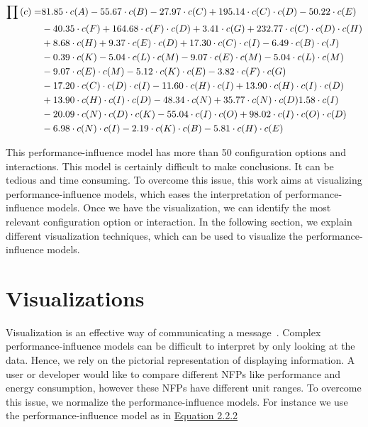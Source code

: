 \begin{align}
\prod {(c)}  = &81.85 \cdot c(A) - 55.67 \cdot c(B) - 27.97 \cdot
    c(C)+195.14\cdot c(C)\cdot c(D) - 50.22 \cdot c(E) \notag\\
    &- 40.35 \cdot c(F) + 164.68 \cdot c(F) \cdot c(D) +  3.41 \cdot c(G) + 232.77 \cdot c(C)  \cdot c(D) \cdot c(H) \notag\\
    &+ 8.68 \cdot c(H) + 9.37 \cdot c(E) \cdot c(D) + 17.30 \cdot c(C) \cdot c(I)  - 6.49 \cdot c(B) \cdot c(J)\notag\\
    & - 0.39 \cdot c(K) - 5.04 \cdot c(L) \cdot c(M) - 9.07 \cdot c(E) \cdot c(M) - 5.04 \cdot c(L) \cdot c(M)\notag\\
    &- 9.07 \cdot c(E) \cdot c(M) -5.12 \cdot c(K) \cdot c(E) - 3.82 \cdot c(F) \cdot c(G)\notag\\
    &- 17.20 \cdot c(C) \cdot c(D) \cdot c(I) - 11.60 \cdot c(H) \cdot c(I) + 13.90 \cdot c(H) \cdot c(I) \cdot c(D) \notag\\
    &+ 13.90 \cdot c(H) \cdot c(I) \cdot c(D) - 48.34 \cdot c(N) + 35.77 \cdot c(N) \cdot c(D)  1.58 \cdot c(I) \notag\\
    &- 20.09 \cdot c(N) \cdot c(D) \cdot c(K) - 55.04 \cdot c(I) \cdot c(O) + 98.02 \cdot c(I) \cdot c(O) \cdot c(D)\notag\\
    & - 6.98 \cdot c(N) \cdot c(I) - 2.19 \cdot c(K) \cdot c(B) - 5.81 \cdot c(H) \cdot c(E) \notag
\end{align}

This performance-influence model has more than 50 configuration options and interactions. This model is certainly difficult to make conclusions. It can be tedious and time consuming. To overcome this issue, this work aims at visualizing performance-influence models, which eases the interpretation of performance-influence models. Once we have the visualization, we can identify the most relevant configuration option or interaction. In the following section, we explain different visualization techniques, which can be used to visualize the performance-influence models.

\section{Visualizations}
\label{sec:2.3}
Visualization is an effective way of communicating a message~\cite{DBLP:conf/vissym/IsaacsGJGB0HB14}. Complex performance-influence models can be difficult to interpret by only looking at the data. Hence, we rely on the pictorial representation of displaying information. A user or developer would like to compare different NFPs like performance and energy consumption, however these NFPs have different unit ranges. To overcome this issue, we normalize the performance-influence models.
For instance we use the performance-influence model as in \hyperref[eq:2.2.2]{Equation 2.2.2}

